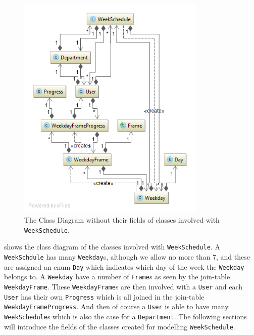 \begin{figure}
    \centering
        \includegraphics[width=0.8\textwidth]{figures/weekscheduleclassdiagram.png}
    \caption{The Class Diagram without their fields of classes involved with \texttt{WeekSchedule}.}\label{fig:weekscheduleclassdiagram}
\end{figure}

 shows the class diagram of the classes involved with \texttt{WeekSchedule}.
A \texttt{WeekSchdule} has many \texttt{Weekday}s, although we allow no more than 7, and these are assigned an enum \texttt{Day} which indicates which day of the week the \texttt{Weekday} belongs to.
A \texttt{Weekday} have a number of \texttt{Frame}s as seen by the join-table \texttt{WeekdayFrame}.
These \texttt{WeekdayFrame}s are then involved with a \texttt{User} and each \texttt{User} has their own \texttt{Progress} which is all joined in the join-table \texttt{WeekdayFrameProgress}.
And then of course a \texttt{User} is able to have many \texttt{WeekSchedule}s which is also the case for a \texttt{Department}.
The following sections will introduce the fields of the classes created for modelling \texttt{WeekSchedule}.

